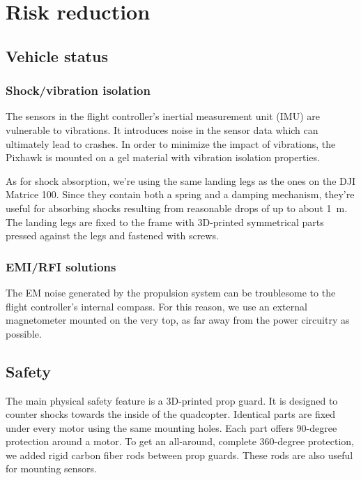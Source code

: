 \section*{Risk reduction} \label{sec:risk}

\subsection*{Vehicle status}\label{sec:risk-vehicle}

\subsubsection*{Shock/vibration isolation}

The sensors in the flight controller’s inertial measurement unit (IMU) are vulnerable to vibrations. It introduces noise in the sensor data which can ultimately lead to crashes. In order to minimize the impact of vibrations, the Pixhawk is mounted on a gel material with vibration isolation properties.

As for shock absorption, we’re using the same landing legs as the ones on the DJI Matrice 100. Since they contain both a spring and a damping mechanism, they’re useful for absorbing shocks resulting from reasonable drops of up to about 1~m. The landing legs are fixed to the frame with 3D-printed symmetrical parts pressed against the legs and fastened with screws.

\subsubsection*{EMI/RFI solutions}

The EM noise generated by the propulsion system can be troublesome to the flight controller’s internal compass. For this reason, we use an external magnetometer mounted on the very top, as far away from the power circuitry as possible.

\subsection*{Safety} \label{subsec:risk-safety}

The main physical safety feature is a 3D-printed prop guard. It is designed to counter shocks towards the inside of the quadcopter. Identical parts are fixed under every motor using the same mounting holes. Each part offers 90-degree protection around a motor. To get an all-around, complete 360-degree protection, we added rigid carbon fiber rods between prop guards. These rods are also useful for mounting sensors.

